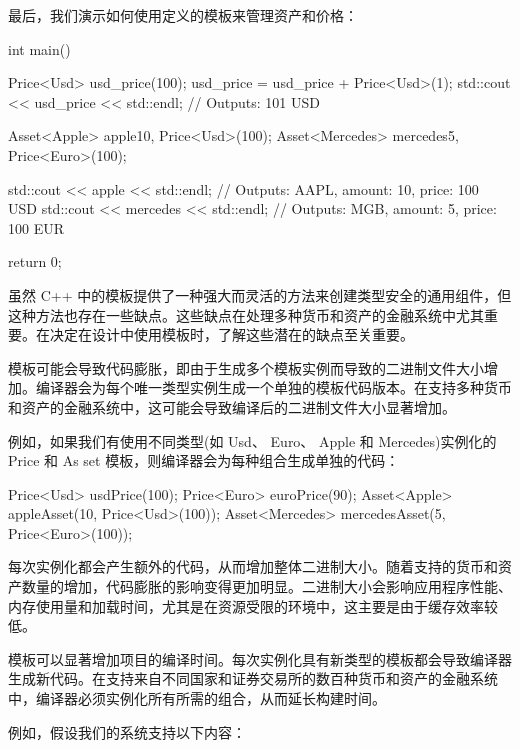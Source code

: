 
最后，我们演示如何使用定义的模板来管理资产和价格：

\begin{cpp}
int main() {
    Price<Usd> usd_price(100);
    usd_price = usd_price + Price<Usd>(1);
    std::cout << usd_price << std::endl; // Outputs: 101 USD

    Asset<Apple> apple{10, Price<Usd>(100)};
    Asset<Mercedes> mercedes{5, Price<Euro>(100)};

    std::cout << apple << std::endl; // Outputs: AAPL, amount: 10, price: 100 USD
    std::cout << mercedes << std::endl; // Outputs: MGB, amount: 5, price: 100 EUR

    return 0;
}
\end{cpp}


虽然 C++ 中的模板提供了一种强大而灵活的方法来创建类型安全的通用组件，但这种方法也存在一些缺点。这些缺点在处理多种货币和资产的金融系统中尤其重要。在决定在设计中使用模板时，了解这些潜在的缺点至关重要。


模板可能会导致代码膨胀，即由于生成多个模板实例而导致的二进制文件大小增加。编译器会为每个唯一类型实例生成一个单独的模板代码版本。在支持多种货币和资产的金融系统中，这可能会导致编译后的二进制文件大小显著增加。

例如，如果我们有使用不同类型(如 Usd、 Euro、 Apple 和 Mercedes)实例化的 Price 和 As set 模板，则编译器会为每种组合生成单独的代码：

\begin{cpp}
Price<Usd> usdPrice(100);
Price<Euro> euroPrice(90);
Asset<Apple> appleAsset(10, Price<Usd>(100));
Asset<Mercedes> mercedesAsset(5, Price<Euro>(100));
\end{cpp}

每次实例化都会产生额外的代码，从而增加整体二进制大小。随着支持的货币和资产数量的增加，代码膨胀的影响变得更加明显。二进制大小会影响应用程序性能、内存使用量和加载时间，尤其是在资源受限的环境中，这主要是由于缓存效率较低。


模板可以显著增加项目的编译时间。每次实例化具有新类型的模板都会导致编译器生成新代码。在支持来自不同国家和证券交易所的数百种货币和资产的金融系统中，编译器必须实例化所有所需的组合，从而延长构建时间。

例如，假设我们的系统支持以下内容：

